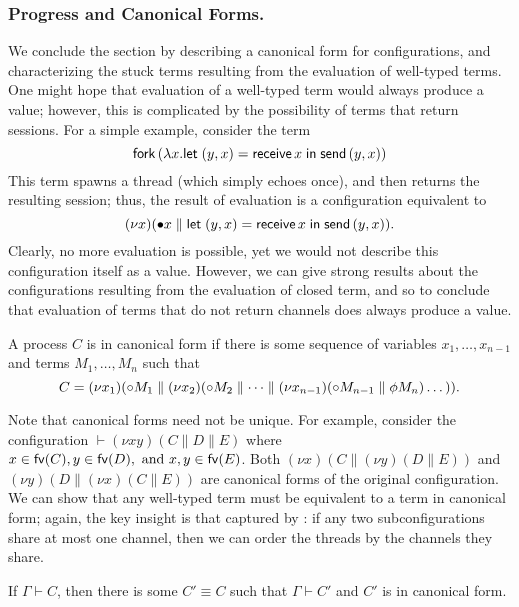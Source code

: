 \documentclass[orivec,envcountsame]{llncs}
\begin{document}
\subsubsection{Progress and Canonical Forms.}

We conclude the section by describing a canonical form for configurations, and characterizing the
stuck terms resulting from the evaluation of well-typed terms.  One might hope that evaluation of a
well-typed term would always produce a value; however, this is complicated by the possibility of
terms that return sessions.  For a simple example, consider the term
%
\[
  \mathsf{fork} \, (\lambda x. \mathsf{let}\;(y,x) = \mathsf{receive} \, x\;\mathsf{in}\;\mathsf{send} \, (y,x))
\]
%
This term spawns a thread (which simply echoes once), and then returns the resulting session; thus,
the result of evaluation is a configuration equivalent to
\[
  (\nu x)({\mathord{\bullet}} x \parallel \mathsf{let}\;(y,x) = \mathsf{receive} \, x\;\mathsf{in}\;\mathsf{send} \, (y,x)).
\]
Clearly, no more evaluation is possible, yet we would not describe this configuration itself as a
value.  However, we can give strong results about the configurations resulting from the evaluation
of closed term, and so to conclude that evaluation of terms that do not return channels does always
produce a value.

\begin{definition}
A process $C$ is in canonical form if there is some sequence of variables $x_1,\dots,x_{n-1}$ and
terms $M_1,\dots,M_n$ such that
\[
  C = (\nu x_1)({\mathord{\circ}} M_1 \parallel (\nu x_2)({\mathord{\circ}} M_2 \parallel \dots \parallel (\nu x_{n-1})({\mathord{\circ}} M_{n-1} \parallel \phi M_n)\dots)).
\]
\end{definition}

Note that canonical forms need not be unique.  For example, consider the configuration $\vdash (\nu
xy)(C \parallel D \parallel E)$ where $x \in \mathsf{fv}(C), y \in \mathsf{fv}(D), \text{ and } x,y \in \mathsf{fv}(E)$.
Both $(\nu x)(C \parallel (\nu y)(D \parallel E))$ and $(\nu y)(D \parallel (\nu x)(C \parallel E))$
are canonical forms of the original configuration.  We can show that any well-typed term must be
equivalent to a term in canonical form; again, the key insight is that captured by
: if any two subconfigurations share at most one channel, then we
can order the threads by the channels they share.

\begin{lemma}\label{thm:canonical}
  If $\Gamma \vdash C$, then there is some $C' \equiv C$ such that $\Gamma \vdash C'$ and $C'$ is in
  canonical form.
\end{lemma}
\end{document}
